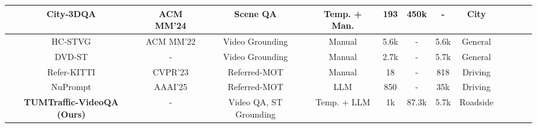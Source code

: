 \begin{table*}[thb!]
{\begin{tabular}{c|ccccccccccc}

City-3DQA \cite{sun20243dquestionansweringcity} & ACM MM'24& Scene QA & Temp. + Man. & 193 & 450k & - &  City \\

\midrule
HC-STVG \cite{hc-stvg} & ACM MM'22 & Video Grounding & Manual &5.6k & - & 5.6k&General\\

DVD-ST \cite{dvd-st} & -  & Video Grounding & Manual & 2.7k & - &5.7k & General  \\

Refer-KITTI \cite{referkitti} & CVPR'23  & Referred-MOT & Manual & 18 & - & 818 & Driving \\

NuPrompt \cite{nuprompt}         & AAAI'25 & Referred-MOT & LLM & 850 & - & 35k  & Driving \\



\midrule

\textbf{TUMTraffic-VideoQA (Ours)} & - & Video QA, ST Grounding & Temp. + LLM  &1k & 87.3k  & 5.7k &  Roadside \\

\midrule
\end{tabular}%
}

\label{tab:related_datasets}
\end{table*}








